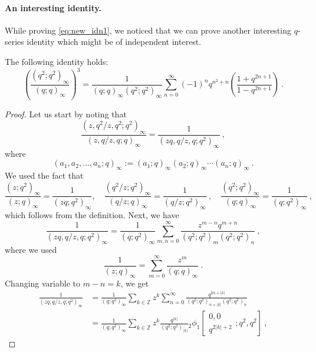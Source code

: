 \documentclass[a4paper,10pt]{article}
\newcommand{\Z}{\mathds{Z}}
\begin{document}
\paragraph{An interesting identity.} While proving \eqref{eq:new_idn1}, we noticed that we can prove another interesting $q$-series identity which might be of independent interest.
\begin{thm}
The following identity holds:
\begin{equation}
\left(\frac{\left(q^{2} ; q^{2}\right)_{\infty}}{(q ; q)_{\infty}}\right)^3= \frac{1}{(q;q)_\infty(q^2;q^2)_{\infty}}\sum_{n=0}^\infty(-1)^nq^{n^2+n}\left(\frac{1+q^{2n+1}}{1-q^{2n+1}}\right)~.    
\end{equation}
\begin{proof}
Let us start by noting that 
\begin{equation}
    \frac{(z,q^2/z,q^2;q^2)_\infty}{(z,q/z,q;q)_\infty}=\frac{1}{(zq,q/z,q;q^2)_\infty}~,
\end{equation}
where 
\begin{equation}
    (a_1,a_2,\dots,a_n;q)_\infty:=(a_1;q)_\infty(a_2;q)_\infty\cdots (a_n;q)_\infty~.
\end{equation}
We used the fact that 
\begin{equation}
    \frac{(z;q^2)_\infty}{(z;q)_\infty}=\frac{1}{(zq;q^2)_\infty},\quad \frac{(q^2/z;q^2)_\infty}{(q/z;q)_\infty}=\frac{1}{(q/z;q^2)_\infty}~,\quad \frac{(q^2;q^2)_\infty}{(q;q)_\infty}=\frac{1}{(q;q^2)_\infty}~,
\end{equation}
which follows from the definition. Next, we have 
\begin{equation}
\frac{1}{(zq,q/z,q;q^2)_\infty}=\frac{1}{(q;q^2)_\infty}\sum_{m,n=0}^\infty \frac{z^{m-n}q^{m+n}}{(q^2;q^2)_m(q^2;q^2)_n}~,    
\end{equation}
where we used 
\begin{equation}
    \frac{1}{(z;q)_\infty}=\sum_{m=0}^\infty\frac{z^m}{(q;q)_\infty}~.
\end{equation}
Changing variable to $m-n=k$, we get 
\begin{equation}
\begin{split}
\frac{1}{(zq,q/z,q;q^2)_\infty}&=\frac{1}{(q;q^2)_\infty}\sum_{k\in\Z}z^k\sum_{n=0}^\infty \frac{q^{2n+|k|}}{(q^2;q^2)_{n+|k|}(q^2;q^2)_n}
\\&=\frac{1}{(q;q^2)_\infty}\sum_{k\in\Z}z^k\frac{q^{|k|}}{(q^2;q^2)_{|k|}}{ }_2 \phi_1\left[\begin{array}{c}0,0\\ q^{2|k|+2}\end{array} ; q^2, q^2\right]~,

\end{split}
\end{equation}
\end{proof}
\end{thm}
\end{document}
